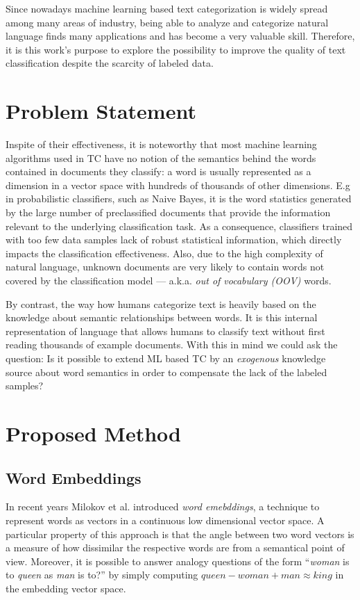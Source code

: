 Since nowadays machine learning based text categorization is widely spread
among many areas of industry, being able to analyze and categorize natural
language finds many applications and has become a very valuable skill. 
Therefore, it is this work's purpose to explore the possibility to improve 
the quality of text classification despite the scarcity of labeled data.

\section{Problem Statement}

Inspite of their effectiveness, it is noteworthy that most machine learning
algorithms used in TC have no notion of the semantics behind the words
contained in documents they classify: a word is usually represented as a dimension
in a vector space with hundreds of thousands of other dimensions. E.g in
probabilistic classifiers, such as Naive Bayes, it is the word statistics
generated by the large number of preclassified documents that provide the information relevant to the
underlying classification task.
As a consequence, classifiers trained with too few data samples lack of
robust statistical information, which directly impacts the classification
effectiveness. Also, due to the high complexity of natural language,
unknown documents are very likely to contain words not covered by the
classification model --- a.k.a. \emph{out of vocabulary (OOV)} words.

By contrast, the way how humans categorize text is heavily based on the
knowledge about semantic relationships between words. It is this internal representation
of language that allows humans to classify text without first reading thousands of example documents. 
With this in mind we could ask the question: Is it possible to extend ML
based TC by an \emph{exogenous} knowledge source about word semantics in order
to compensate the lack of the labeled samples?

\section{Proposed Method}
\label{sec:introduction:proposed-method}
\subsection{Word Embeddings}
In recent years Milokov et al. introduced \emph{word emebddings}, a technique to
represent words as vectors in a continuous low dimensional vector space. 
A particular property of this approach is that the angle
between two word vectors is a measure of how dissimilar the respective words are from a
semantical point of view.
Moreover, it is possible to answer analogy questions of the form ``\emph{woman} is to
 \emph{queen} as \emph{man} is to?'' by simply computing $\mathit{queen} - \mathit{woman} +
\mathit{man} \approx \mathit{king}$ in the embedding vector space. 

